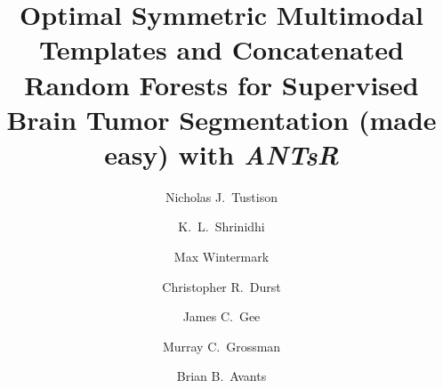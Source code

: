\documentclass[final,5p,times,twocolumn]{elsarticle}
\begin{document}
\begin{frontmatter}

\title{Optimal Symmetric Multimodal Templates and Concatenated Random Forests for Supervised Brain Tumor Segmentation (made easy) with \textit{ANTsR}}

\author[label1]{Nicholas J.~Tustison
  }
\author[label2]{K.~L.~Shrinidhi}
\author[label1]{Max Wintermark}
\author[label1]{Christopher R.~Durst}
\author[label1]{James C.~Gee}
\author[label3]{Murray C.~Grossman}
\author[label2]{Brian B.~Avants}
\address[label1]{Department of Radiology and Medical Imaging, University of Virginia, Charlottesville, VA}
\address[label2]{Penn Image Computing and Science Laboratory, 
                 Department of Radiology, University of Pennsylvania,
                Philadelphia, PA}
\address[label3]{Department of Neurology, University of Pennsylvania,
                Philadelphia, PA}




\end{frontmatter}
\end{document}
